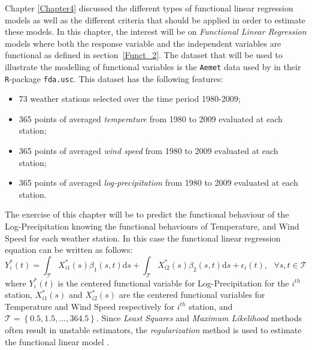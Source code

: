 Chapter \ref{Chapter4} discussed the different types of functional linear regression models as well as the different criteria that should be applied in order to estimate these models. In this chapter, the interest will be on \textit{Functional Linear Regression} models where both the response variable and the independent variables are functional as defined in section~\ref{Funct_2}. The dataset that will be used to illustrate the modelling of functional variables is the \texttt{Aemet} data used by \cite{fda.usc} in their \texttt{R}-package \texttt{fda.usc}. This dataset has the following features:
\begin{itemize}
\item 73 weather stations selected over the time period 1980-2009;
\item 365 points of averaged \textit{temperature} from 1980 to 2009 evaluated at each station;
\item 365 points of averaged \textit{wind speed} from 1980 to 2009 evaluated at each station;
\item 365 points of averaged \textit{log-precipitation} from 1980 to 2009 evaluated at each station.
\end{itemize} 
The exercise of this chapter will be to predict the functional behaviour of the Log-Precipitation knowing the functional behaviours of Temperature, and Wind Speed for each weather station. In this case the functional linear regression equation can be written as follows:
\begin{equation}\label{chap5_eq1}
Y^{*}_i(t) = \int_{\mathcal{T}} X^{*}_{i1}(s) \beta_{1}(s,t)\mathrm{d}s + \int_{\mathcal{T}} X^{*}_{i2}(s) \beta_{2}(s,t)\mathrm{d}s + \epsilon_i(t), \text{ } \forall s, t \in \mathcal{T} 
\end{equation}
where $Y^{*}_i(t)$ is the centered functional variable for Log-Precipitation for the $i^{th}$ station, $X^{*}_{i1}(s)$ and $X^{*}_{i2}(s)$ are the centered functional variables for Temperature and Wind Speed respectively for $i^{th}$ station, and $\mathcal{T} = \left\{0.5,1.5,\dots,364.5\right\}$.  Since \textit{Least Squares} and \textit{Maximum Likelihood} methods often result in unstable estimators, the \textit{regularization} method is used to estimate the functional linear model \citep{Matsui2009}.

